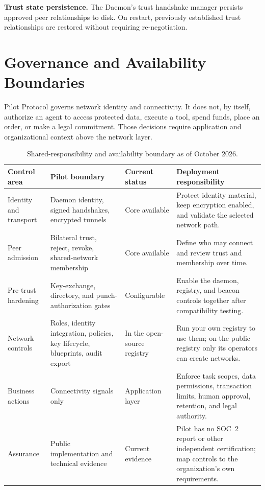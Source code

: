 \documentclass[11pt,a4paper]{article}
\begin{document}
\textbf{Trust state persistence.} The Daemon's trust handshake manager persists approved peer relationships to disk. On restart, previously established trust relationships are restored without requiring re-negotiation.

\section{Governance and Availability Boundaries}

Pilot Protocol governs network identity and connectivity. It does not, by itself, authorize an agent to access protected data, execute a tool, spend funds, place an order, or make a legal commitment. Those decisions require application and organizational context above the network layer.

\begin{table}[h]
\centering
\small
\begin{tabularx}{\textwidth}{@{}p{}p{}p{}X@{}}
\toprule
\textbf{Control area} & \textbf{Pilot boundary} & \textbf{Current status} & \textbf{Deployment responsibility} \\
\midrule
Identity and transport & Daemon identity, signed handshakes, encrypted tunnels & Core available & Protect identity material, keep encryption enabled, and validate the selected network path. \\
Peer admission & Bilateral trust, reject, revoke, shared-network membership & Core available & Define who may connect and review trust and membership over time. \\
Pre-trust hardening & Key-exchange, directory, and punch-authorization gates & Configurable & Enable the daemon, registry, and beacon controls together after compatibility testing. \\
Network controls & Roles, identity integration, policies, key lifecycle, blueprints, audit export & In the open-source registry & Run your own registry to use them; on the public registry only its operators can create networks. \\
Business actions & Connectivity signals only & Application layer & Enforce task scopes, data permissions, transaction limits, human approval, retention, and legal authority. \\
Assurance & Public implementation and technical evidence & Current evidence & Pilot has no SOC~2 report or other independent certification; map controls to the organization's own requirements. \\
\bottomrule
\end{tabularx}
\caption{Shared-responsibility and availability boundary as of October 2026.}
\label{tab:governance}
\end{table}
\end{document}
